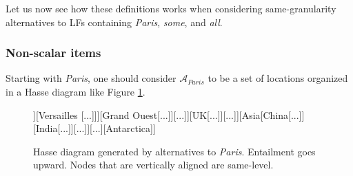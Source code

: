 \begin{exe}
	\ex \label{ex7:same-gran-alt-unpacking}
	\begin{xlist}
	\end{xlist}
\end{exe}


Let us now see how these definitions works when considering same-granularity alternatives to LFs containing \textit{Paris}, \textit{some}, and \textit{all}.

\subsubsection{Non-scalar items}
Starting with \textit{Paris}, one should consider $\mathcal{A}_{\textit{Paris}}$ to be a set of locations organized in a Hasse diagram like Figure \ref{fig7:paris-hasse}.

\begin{figure}[H]
	\centering
	\begin{forest}
		[World[Europe[France[Île-de-France[Paris [Ier][...][XXème]][Versailles [...]]][Grand Ouest[...]][...]][UK[...]][...]][Asia[China[...]][India[...]][...]][...][Antarctica]]
	\end{forest}
	\caption{Hasse diagram generated by alternatives to \textit{Paris}. Entailment goes upward. Nodes that are vertically aligned are same-level.}
	\label{fig7:paris-hasse}
\end{figure}

